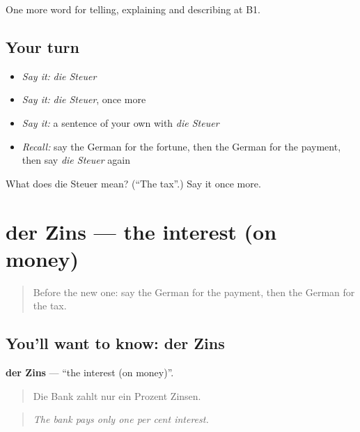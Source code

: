\begin{grammarlens}[title={What you've built}]
One more word for telling, explaining and describing at B1.
\end{grammarlens}

\subsection*{Your turn}
\begin{itemize}
\raggedright
  \item \emph{Say it:} \emph{die Steuer}
  \item \emph{Say it:} \emph{die Steuer}, once more
  \item \emph{Say it:} a sentence of your own with \emph{die Steuer}
  \item \emph{Recall:} say the German for the fortune, then the German for the payment, then say \emph{die Steuer} again
\end{itemize}

\begin{tcolorbox}[breakable,colback=teal!4,colframe=teal!35!black,title={Before you move on}]
What does die Steuer mean? (\textquotedblleft{}The tax\textquotedblright{}.) Say it once more.
\end{tcolorbox}
\section[der Zins]{der Zins — the interest (on money)}

\label{lesson:GE-C391-zins}



\begin{quote}
Before the new one: say the German for the payment, then the German for the tax.
\end{quote}

\subsection*{You'll want to know: der Zins}
\textbf{der Zins} — \textquotedblleft{}the interest (on money)\textquotedblright{}.

\begin{quote}
Die Bank zahlt nur ein Prozent Zinsen.
\end{quote}

\begin{quote}
\emph{The bank pays only one per cent interest.}
\end{quote}

